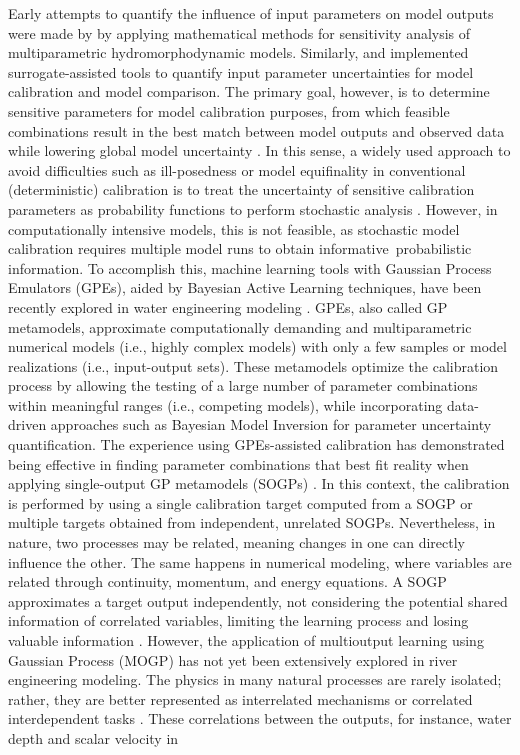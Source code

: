 \documentclass[draft,linenumbers,onecolumn]{agujournal2019} %
\begin{document}
Early attempts to quantify the influence of input parameters on model outputs were made by  by applying mathematical methods for sensitivity analysis of multiparametric hydromorphodynamic models. Similarly,  and  implemented surrogate-assisted tools to quantify input parameter uncertainties for model calibration and model comparison. The primary goal, however, is to determine sensitive parameters for model calibration purposes, from which feasible combinations result in the best match between model outputs and observed data while lowering global model uncertainty \cite{oberkampf2004verification}. In this sense, a widely used approach to avoid difficulties such as ill-posedness or model equifinality in conventional (deterministic) calibration is to treat the uncertainty of sensitive calibration parameters as probability functions to perform stochastic analysis \cite{kim2016stepwise}. However, in computationally intensive models, this is not feasible, as stochastic model calibration requires multiple model runs to obtain informative probabilistic information. To accomplish this, machine learning tools with Gaussian Process Emulators (GPEs), aided by Bayesian Active Learning techniques, have been recently explored in water engineering modeling \cite{oladyshkin2020bayesian3}. GPEs, also called GP metamodels, approximate computationally demanding and multiparametric numerical models (i.e., highly complex models) with only a few samples or model realizations (i.e., input-output sets). These metamodels optimize the calibration process by allowing the testing of a large number of parameter combinations within meaningful ranges (i.e., competing models), while incorporating data-driven approaches such as Bayesian Model Inversion \cite{mohammadi2018bayesian} for parameter uncertainty quantification. The experience using GPEs-assisted calibration has demonstrated being effective in finding parameter combinations that best fit reality when applying single-output GP metamodels (SOGPs) \cite{schwindt2023bayesian, mouris2023stability}. In this context, the calibration is performed by using a single calibration target computed from a SOGP or multiple targets obtained from independent, unrelated SOGPs. Nevertheless, in nature, two processes may be related, meaning changes in one can directly influence the other. The same happens in numerical modeling, where variables are related through continuity, momentum, and energy equations. A SOGP approximates a target output independently, not considering the potential shared information of correlated variables, limiting the learning process and losing valuable information \cite{lin2021multioutput}. However, the application of multioutput learning using Gaussian Process (MOGP) has not yet been extensively explored in river engineering modeling. The physics in many natural processes are rarely isolated; rather, they are better represented as interrelated mechanisms or correlated interdependent tasks \cite{bonilla2007multitask}. These correlations between the outputs, for instance, water depth and scalar velocity in 
\end{document}
